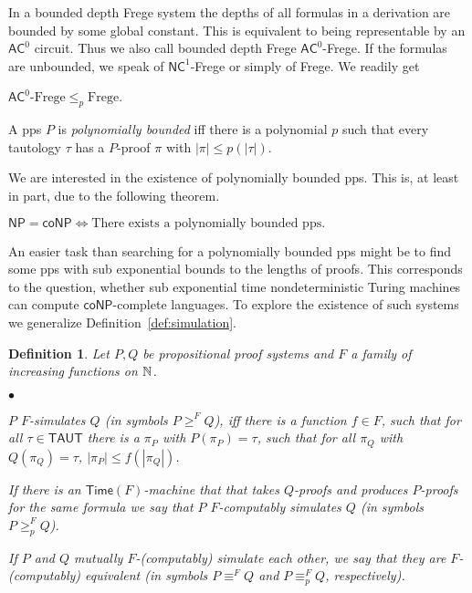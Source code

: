 \documentclass{LMCS}
\newcommand{\Nat}{\ensuremath \mathbb N}
\newcommand{\abs}[1]{\left\vert#1\right\vert}
\newtheorem{definition}{Definition}[section]
\begin{document}
In a bounded depth Frege system the depths of all formulas in a derivation are bounded by some global constant.
This is equivalent to being representable by an $\mathsf{AC}^0$ circuit. Thus we also call bounded depth Frege
$\mathsf{AC}^0$-Frege. If the formulas are unbounded, we speak of $\mathsf{NC}^1$-Frege or simply of Frege. We
readily get

\begin{fact}
  $\mathsf{AC}^0 \mbox{-Frege} \leq_p \mbox{Frege}$.
\end{fact}

A pps $P$ is {\em polynomially bounded} iff there is a polynomial $p$ such that every tautology $\tau$ has a
$P$-proof $\pi$ with $\abs{\pi}\leq p(\abs{\tau})$.

We are interested in the existence of polynomially bounded pps. This is, at least in part, due to the following
theorem.

\begin{fact}[\cite{CR79}]
  $\mathsf{NP=coNP} \Leftrightarrow \mbox{There exists a polynomially bounded pps.}$
\end{fact}

An easier task than searching for a polynomially bounded pps might be to find some pps with sub exponential
bounds to the lengths of proofs. This corresponds to the question, whether sub exponential time nondeterministic
Turing machines can compute $\mathsf{coNP}$-complete languages. To explore the existence of such systems we
generalize Definition~\ref{def:simulation}.

\begin{definition}
    Let $P,Q$ be propositional proof systems and $F$ a family of increasing functions on $\Nat$.
  \begin{iteMize}{$\bullet$}
    \item $P$ $F$-simulates $Q$ (in symbols $P\geq^F Q$), iff there is a function $f\in F$, such that for all $\tau\in\mathsf{TAUT}$ there is a
    $\pi_P$ with $P(\pi_P)=\tau$, such that for all $\pi_Q$ with $Q(\pi_Q)=\tau$, $\abs{\pi_P}\leq
    f(\abs{\pi_Q})$.
    \item If there is an $\mathsf{Time}(F)$-machine that that takes $Q$-proofs and produces $P$-proofs for the same
    formula we say that
    $P$ $F$-computably simulates $Q$ (in symbols $P\geq^F_p Q$).
    \item If $P$ and $Q$ mutually $F$-(computably) simulate each other, we say that they are $F$-(computably) equivalent (in symbols
    $P\equiv^F Q$ and $P\equiv^F_p Q$, respectively).
  \end{iteMize}\smallskip
\end{definition}
\end{document}
